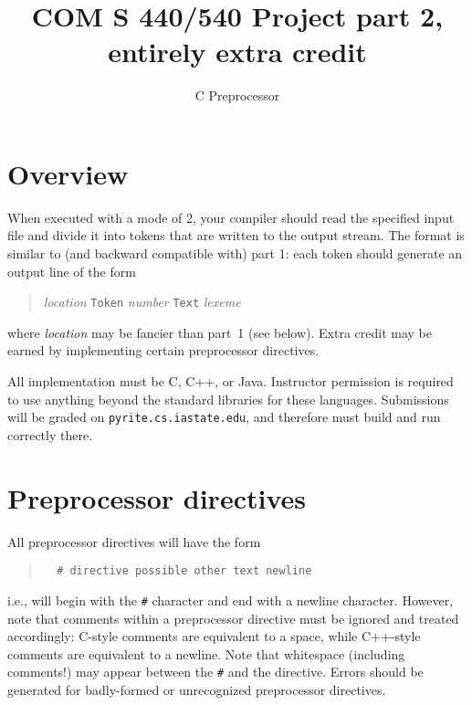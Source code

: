 \documentclass{article}
\title{COM S 440/540 Project part 2, entirely extra credit}
\author{C Preprocessor}
\date{}
\begin{document}
\maketitle

\section{Overview}

When executed with a mode of 2,
your compiler should read the specified input file
and divide it into tokens that are written to the output stream.
The format is similar to (and backward compatible with) part 1:
each token should generate an output line of the form
\begin{quote}
  \emph{location} \verb|Token| \emph{number} \verb|Text| \emph{lexeme}
\end{quote}
where \emph{location} may be fancier than part~1 (see below).
Extra credit may be earned by implementing certain preprocessor directives.

All implementation must be C, C++, or Java.
Instructor permission is required to use anything beyond
the standard libraries for these languages.
Submissions will be graded on {\tt pyrite.cs.iastate.edu},
and therefore must build and run correctly there.

\section{Preprocessor directives}

All preprocessor directives will have the form
\begin{quote}
\begin{verbatim}
  # directive possible other text newline
\end{verbatim}
\end{quote}
i.e., will begin with the \verb|#| character
and end with a newline character.
However, note that comments within a preprocessor directive
must be ignored and treated accordingly:
C-style comments are equivalent to a space,
while C++-style comments are equivalent to a newline.
Note that whitespace (including comments!) may appear
between the \verb|#| and the directive.
Errors should be generated for badly-formed or unrecognized
preprocessor directives.
\end{document}
